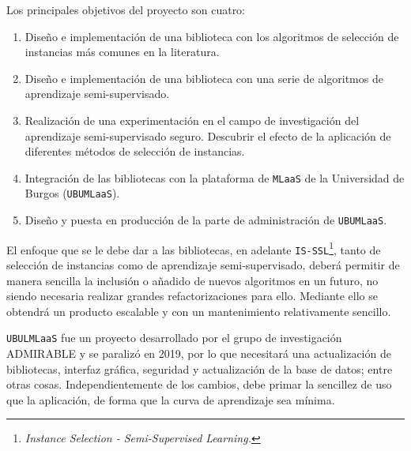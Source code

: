 Los principales objetivos del proyecto son cuatro:

\begin{enumerate}
\item Diseño e implementación de una biblioteca con los algoritmos de selección de instancias más comunes en la literatura.
\item Diseño e implementación de una biblioteca con una serie de algoritmos de aprendizaje semi-supervisado.
\item Realización de una experimentación en el campo de investigación del aprendizaje semi-supervisado seguro. Descubrir el efecto de la aplicación de diferentes métodos de selección de instancias.
\item Integración de las bibliotecas con la plataforma de \texttt{MLaaS} de la Universidad de Burgos (\texttt{UBUMLaaS}).
\item Diseño y puesta en producción de la parte de administración de \texttt{UBUMLaaS}.
\end{enumerate}


El enfoque que se le debe dar a las bibliotecas, en adelante \texttt{IS-SSL}\footnote{\textit{Instance Selection - Semi-Supervised Learning.}}, tanto de selección de instancias como de aprendizaje semi-supervisado, deberá permitir de manera sencilla la inclusión o añadido de nuevos algoritmos en un futuro, no siendo necesaria realizar grandes refactorizaciones para ello. Mediante ello se obtendrá un producto escalable y con un mantenimiento relativamente sencillo.

\texttt{UBULMLaaS} fue un proyecto desarrollado por el grupo de investigación ADMIRABLE y se paralizó en 2019, por lo que necesitará una actualización de bibliotecas, interfaz gráfica, seguridad y actualización de la base de datos; entre otras cosas. Independientemente de los cambios, debe primar la sencillez de uso que la aplicación, de forma que la curva de aprendizaje sea mínima.

